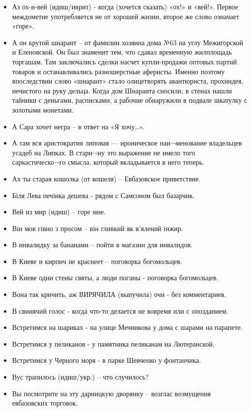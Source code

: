 \begin{itemize}
\item  Аз ох-н-вей (идиш/иврит) -  когда (хочется сказать) «ох!» и «вей!».
Первое междометие употребляется не от хорошей жизни, второе же слово означает
«горе». 
\item  А он крутой шнарант – от фамилии хозяина дома №63 на углу Межигорской и
Еленовской. Он был знаменит тем, что сдавал временную жилплощадь торгашам. Там
заключались сделки насчет купли-продажи оптовых партий товаров и
останавливались разношерстные аферисты. Именно поэтому впоследствии слово
«шнарант» стало олицетворять авантюриста, прохиндея, нечистого на руку дельца.
Когда дом Шнаранта сносили, в стенах нашли тайники с деньгами, расписками, а
рабочие обнаружили в подвале шкатулку с золотыми монетами.

\item  А Сара хочет негра – в ответ на «Я хочу…».
\item  А там вся аристократия липовая — ироническое наи¬менование владельцев усадеб на Липках. В стари¬ну это выражение не имело того саркастическо¬го смысла, который вкладывается в него теперь.
\item  Ах ты старая кошолка (от кошеля) – Евбазовское приветствие.
\item  Біля Лева печінка дешева - рядом с Самсоном был базарчик.
\item  Вей из мир (идиш) – горе мне.
\item  Він мов гівно з просом – він гливкий як в’ялений інжир. 
\item  В инвалидку за бананами – пойти в магазин для инвалидов.
\item  В Киеве и кирпич не краснеет – поговорка богомольцев. 
\item  В Киеве одни стены святы, а люди поганы - поговорка богомольцев.
\item  Вона так кричить, аж ВИРЯЧИЛА (выпучила) очи - без комментариев.
\item  В свинячий голос - когда что-то делается не вовремя или с опозданием.
\item  Встретимся на шариках - на улице Мечникова у дома с шарами на парапете. 
\item  Встретимся у пеликанов - у памятника пеликанам  на Лютеранской.
\item  Встретимся у Черного моря -  в парке Шевченко у фонтанчика.
\item  Вус трапилось (идиш/укр.) – что случилось?
\item  Вы посмотрите на эту дарницкую дворянку – возглас возмущения евбазовских торговок.

\end{itemize}
